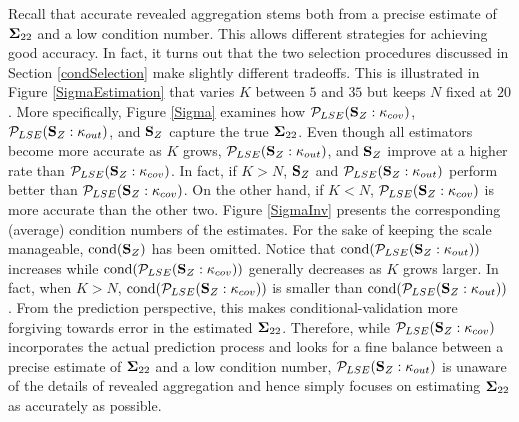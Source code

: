 \documentclass[11pt]{article}
\theoremstyle{definition}
\theoremstyle{definition}
\def\bSigma{{\bf \Sigma}}
\def\SS{{\bf S}}
\def\cond{\text{cond}}
\begin{document}
Recall  that accurate revealed aggregation stems both from a precise estimate of $\bSigma_{22}$ and a low condition number. This allows different strategies for achieving good accuracy. In fact, it turns out that the two selection procedures discussed in Section \ref{condSelection} make slightly different tradeoffs. This is illustrated in  Figure \ref{SigmaEstimation} that varies $K$ between $5$ and $35$ but keeps $N$ fixed at $20$. More specifically,  Figure \ref{Sigma} examines how $\mathcal{P}_{LSE}(\SS_Z : \kappa_{cov})$, $\mathcal{P}_{LSE}(\SS_Z : \kappa_{out})$, and $\SS_Z$ capture the true $\bSigma_{22}$. 
Even though all estimators become more accurate as $K$ grows, $\mathcal{P}_{LSE}(\SS_Z : \kappa_{out})$, and $\SS_Z$ improve at a higher rate than $\mathcal{P}_{LSE}(\SS_Z : \kappa_{cov})$.  In fact, if $K > N$, $\SS_Z$ and $\mathcal{P}_{LSE}(\SS_Z : \kappa_{out})$ perform better than $\mathcal{P}_{LSE}(\SS_Z : \kappa_{cov})$. On the other hand, if $K < N$, $\mathcal{P}_{LSE}(\SS_Z : \kappa_{cov})$ is more accurate than the other two. Figure \ref{SigmaInv}  presents the corresponding (average) condition numbers of the estimates. For the sake of keeping the scale manageable, $\cond(\SS_Z)$ has been omitted. Notice that $\cond(\mathcal{P}_{LSE}(\SS_Z : \kappa_{out}))$ increases while $\cond(\mathcal{P}_{LSE}(\SS_Z : \kappa_{cov}))$ generally decreases as $K$ grows larger. In fact, when $K > N$,  $\cond(\mathcal{P}_{LSE}(\SS_Z : \kappa_{cov}))$ is smaller than $\cond(\mathcal{P}_{LSE}(\SS_Z : \kappa_{out}))$. From the prediction perspective, this makes conditional-validation more forgiving towards error in the estimated $\bSigma_{22}$. Therefore, while $\mathcal{P}_{LSE}(\SS_Z : \kappa_{cov})$ incorporates the actual prediction process and looks for a fine balance between a precise estimate of $\bSigma_{22}$ and a low condition number, $\mathcal{P}_{LSE}(\SS_Z : \kappa_{out})$ is unaware of the details of revealed aggregation and hence simply focuses on estimating $\bSigma_{22}$ as accurately as possible. 



\end{document}
